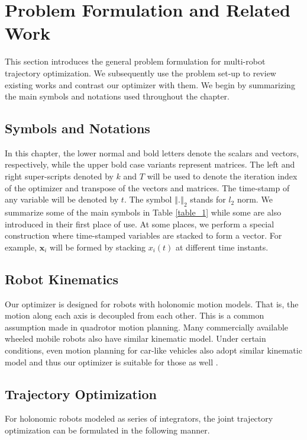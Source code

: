 \section{Problem Formulation and Related Work}
This section introduces the general problem formulation for multi-robot trajectory optimization. We subsequently use the problem set-up to review existing works and contrast our optimizer with them. We begin by summarizing the main symbols and notations used throughout the chapter.

\subsection{Symbols and Notations}
\noindent In this chapter, the lower normal and bold letters denote the scalars and vectors, respectively, while the upper bold case variants represent matrices. The left and right super-scripts denoted by $k$ and $T$ will be used to denote the iteration index of the optimizer and transpose of the vectors and matrices. The time-stamp of any variable will be denoted by $t$. The symbol $\left\Vert \textbf{.} \right\Vert_{2}$ stands for $l_{2}$ norm. We summarize some of the main symbols in Table \eqref{table_1} while some are also introduced in their first place of use. At some places, we perform a special construction where time-stamped variables are stacked to form a vector. For example, $\textbf{x}_i$ will be formed by stacking $x_i(t)$ at different time instants.


\subsection{Robot Kinematics}
\noindent Our optimizer is designed for robots with holonomic motion models. That is, the motion along each axis is decoupled from each other. This is a common assumption made in quadrotor motion planning. Many commercially available wheeled mobile robots also have similar kinematic model. Under certain conditions, even motion planning for car-like vehicles also adopt similar kinematic model and thus our optimizer is suitable for those as well \cite{frenet_planner}.


\subsection{Trajectory Optimization }
\noindent For holonomic robots modeled as series of integrators, the joint trajectory optimization can be formulated in the following manner.

